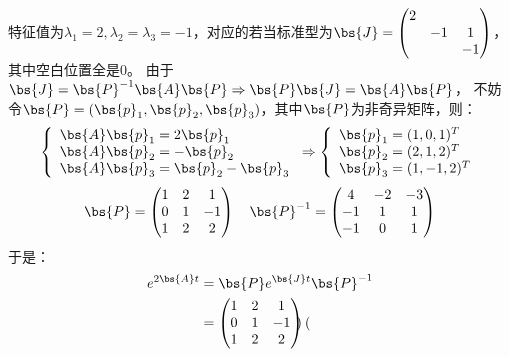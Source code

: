 \documentclass[12pt, a4paper, oneside, UTF8]{ctexbook}
\begin{document}
\begin{solution}
    特征值为$\lambda_1=2,\lambda_2=\lambda_3=-1$，对应的若当标准型为$\bs{J}=\begin{pmatrix}
        2 & & \\
        & -1& 1\\
        & & -1
    \end{pmatrix}$，其中空白位置全是$0$。
    由于$\bs{J}=\bs{P}^{-1}\bs{A}\bs{P} \Rightarrow \bs{P}\bs{J}=\bs{A}\bs{P}$，
    不妨令$\bs{P}=(\bs{p}_1,\bs{p}_2,\bs{p}_3)$，其中$\bs{P}$为非奇异矩阵，则：
    \begin{align*}
        \left\{
            \begin{array}{ll}
                \bs{A}\bs{p}_1=2\bs{p}_1 \\
                \bs{A}\bs{p}_2=-\bs{p}_2 \\
                \bs{A}\bs{p}_3=\bs{p}_2-\bs{p}_3
            \end{array} 
            \right.
            \Rightarrow
            \left\{
            \begin{array}{ll}
                \bs{p}_1=(1,0,1)^T \\
                \bs{p}_2=(2,1,2)^T \\
                \bs{p}_3=(1,-1,2)^T
            \end{array} 
            \right.
    \end{align*}
    \begin{align*}
        \bs{P}=\begin{pmatrix}
            1 & 2 &1 \\
            0 & 1 &-1 \\
            1 & 2 &2
        \end{pmatrix} \quad
        \bs{P}^{-1}=\begin{pmatrix}
            4&-2&-3\\
            -1&1&1\\
            -1&0&1       
        \end{pmatrix}
    \end{align*}
    于是：
    \begin{align*}
        e^{2\bs{A}t}&=\bs{P}e^{\bs{J}t}\bs{P}^{-1} \\
        &=\begin{pmatrix}
            1 & 2 &1 \\
            0 & 1 &-1 \\
            1 & 2 &2
        \end{pmatrix} \begin{pmatrix}

\end{pmatrix}
\end{align*}
\end{solution}
\end{document}
